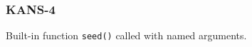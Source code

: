 \subsubsection{KANS-4}\label{sec:error_code_kans_4}

Built-in function \texttt{seed()} called with named arguments.


